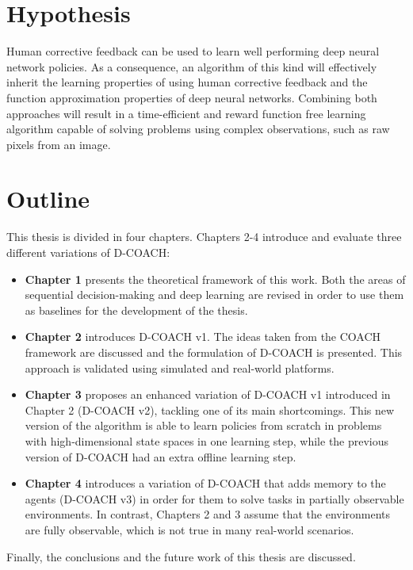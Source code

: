 \begin{intro}
\section{Hypothesis}
Human corrective feedback can be used to learn well performing deep neural network policies. As a consequence, an algorithm of this kind will effectively inherit the learning properties of using human corrective feedback and the function approximation properties of deep neural networks. Combining both approaches will result in a time-efficient and reward function free learning algorithm capable of solving problems using complex observations, such as raw pixels from an image.

\section{Outline}
This thesis is divided in four chapters. Chapters 2-4 introduce and evaluate three different variations of D-COACH:

\begin{itemize}
    \item \textbf{Chapter 1} presents the theoretical framework of this work. Both the areas of sequential decision-making and deep learning are revised in order to use them as baselines for the development of the thesis.
    \item \textbf{Chapter 2} introduces D-COACH v1. The ideas taken from the COACH framework are discussed and the formulation of D-COACH is presented. This approach is validated using simulated and real-world platforms.
    \item \textbf{Chapter 3} proposes an enhanced variation of D-COACH v1 introduced in Chapter 2 (D-COACH v2), tackling one of its main shortcomings. This new version of the algorithm is able to learn policies from scratch in problems with high-dimensional state spaces in one learning step, while the previous version of D-COACH had an extra offline learning step.
    \item \textbf{Chapter 4} introduces a variation of D-COACH that adds memory to the agents (D-COACH v3) in order for them to solve tasks in partially observable environments. In contrast, Chapters 2 and 3 assume that the environments are fully observable, which is not true in many real-world scenarios.
\end{itemize}

Finally, the conclusions and the future work of this thesis are discussed. 

\end{intro}